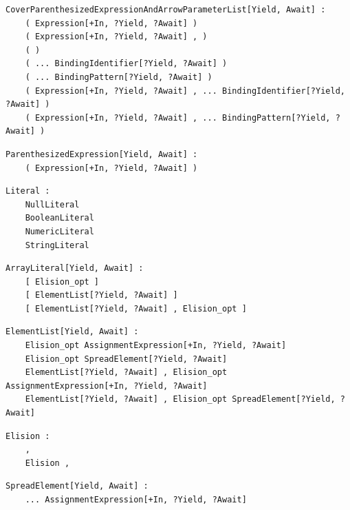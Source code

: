 \noindent\textbf{\texttt{}}\par
\begin{lstlisting}
CoverParenthesizedExpressionAndArrowParameterList[Yield, Await] :
    ( Expression[+In, ?Yield, ?Await] )
    ( Expression[+In, ?Yield, ?Await] , )
    ( )
    ( ... BindingIdentifier[?Yield, ?Await] )
    ( ... BindingPattern[?Yield, ?Await] )
    ( Expression[+In, ?Yield, ?Await] , ... BindingIdentifier[?Yield, ?Await] )
    ( Expression[+In, ?Yield, ?Await] , ... BindingPattern[?Yield, ?Await] )
\end{lstlisting}

\noindent\textbf{\texttt{}}\par
\begin{lstlisting}
ParenthesizedExpression[Yield, Await] :
    ( Expression[+In, ?Yield, ?Await] )
\end{lstlisting}

\noindent\textbf{\texttt{}}\par
\begin{lstlisting}
Literal :
    NullLiteral
    BooleanLiteral
    NumericLiteral
    StringLiteral
\end{lstlisting}

\noindent\textbf{\texttt{}}\par
\begin{lstlisting}
ArrayLiteral[Yield, Await] :
    [ Elision_opt ]
    [ ElementList[?Yield, ?Await] ]
    [ ElementList[?Yield, ?Await] , Elision_opt ]
\end{lstlisting}

\noindent\textbf{\texttt{}}\par
\begin{lstlisting}
ElementList[Yield, Await] :
    Elision_opt AssignmentExpression[+In, ?Yield, ?Await]
    Elision_opt SpreadElement[?Yield, ?Await]
    ElementList[?Yield, ?Await] , Elision_opt AssignmentExpression[+In, ?Yield, ?Await]
    ElementList[?Yield, ?Await] , Elision_opt SpreadElement[?Yield, ?Await]
\end{lstlisting}

\noindent\textbf{\texttt{}}\par
\begin{lstlisting}
Elision :
    ,
    Elision ,
\end{lstlisting}

\noindent\textbf{\texttt{}}\par
\begin{lstlisting}
SpreadElement[Yield, Await] :
    ... AssignmentExpression[+In, ?Yield, ?Await]
\end{lstlisting}

